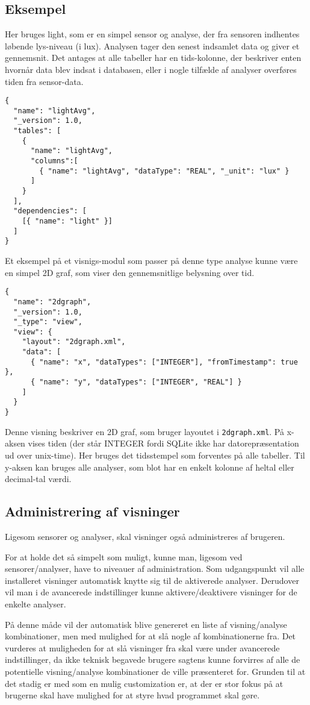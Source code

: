\subsection{Eksempel}
Her bruges light, som er en simpel sensor og analyse, der fra sensoren indhentes løbende lys-niveau (i lux).
Analysen tager den senest indsamlet data og giver et gennemsnit.
Det antages at alle tabeller har en tids-kolonne, der beskriver enten hvornår data blev indsat i databasen, eller i nogle tilfælde af analyser overføres tiden fra sensor-data.

\begin{lstlisting}
{
  "name": "lightAvg",
  "_version": 1.0,
  "tables": [
    {
      "name": "lightAvg",
      "columns":[
        { "name": "lightAvg", "dataType": "REAL", "_unit": "lux" }
      ]
    }
  ],
  "dependencies": [
    [{ "name": "light" }]
  ]
}
\end{lstlisting}

Et eksempel på et visnigs-modul som passer på denne type analyse kunne være en simpel 2D graf, som viser den gennemsnitlige belysning over tid.

\begin{lstlisting}
{
  "name": "2dgraph",
  "_version": 1.0,
  "_type": "view",
  "view": {
    "layout": "2dgraph.xml",
    "data": [
      { "name": "x", "dataTypes": ["INTEGER"], "fromTimestamp": true },
      { "name": "y", "dataTypes": ["INTEGER", "REAL"] }
    ]
  }
}
\end{lstlisting}
 
Denne visning beskriver en 2D graf, som bruger layoutet i \texttt{2dgraph.xml}.
På x-aksen vises tiden (der står INTEGER fordi SQLite ikke har datorepræsentation ud over unix-time).
Her bruges det tidsstempel som forventes på alle tabeller.
Til y-aksen kan bruges alle analyser, som blot har en enkelt kolonne af heltal eller decimal-tal værdi.

\subsection{Administrering af visninger}
Ligesom sensorer og analyser, skal visninger også administreres af brugeren.

For at holde det så simpelt som muligt, kunne man, ligesom ved sensorer/analyser, have to niveauer af administration.
Som udgangspunkt vil alle installeret visninger automatisk knytte sig til de aktiverede analyser.
Derudover vil man i de avancerede indstillinger kunne aktivere/deaktivere visninger for de enkelte analyser.

På denne måde vil der automatisk blive genereret en liste af visning/analyse kombinationer, men med mulighed for at slå nogle af kombinationerne fra.
Det vurderes at muligheden for at slå visninger fra skal være under avancerede indstillinger, da ikke teknisk begavede brugere sagtens kunne forvirres af alle de potentielle visning/analyse kombinationer de ville præsenteret for.
Grunden til at det stadig er med som en mulig customization er, at der er stor fokus på at brugerne skal have mulighed for at styre hvad programmet skal gøre. 
